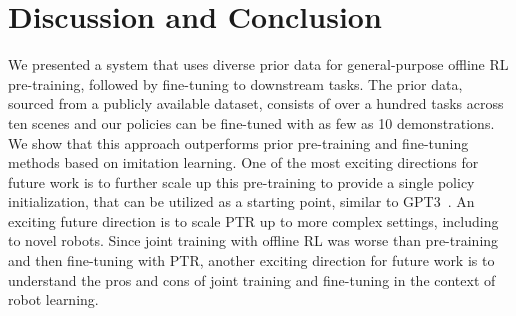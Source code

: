 \documentclass[../thesis.tex]{subfiles}
\begin{document}




\vspace{0.1cm}
\section{Discussion and Conclusion}
\label{sec:conclusion}
\vspace{0.1cm}
We presented a system that uses diverse prior data for general-purpose offline RL pre-training, followed by fine-tuning to downstream tasks. The prior data, sourced from a publicly available dataset, consists of over a hundred tasks across ten scenes and our policies can be fine-tuned with as few as 10 demonstrations. We show that this approach outperforms prior pre-training and fine-tuning methods based on imitation learning. One of the most exciting directions for future work is to further scale up this pre-training to provide a single policy initialization, that can be utilized as a starting point, similar to GPT3~\citep{brown2020language}. 
An exciting future direction is to scale PTR up to more complex settings, including to novel robots. {Since joint training with offline RL was worse than pre-training and then fine-tuning with PTR, another exciting direction for future work is to understand the pros and cons of joint training and fine-tuning in the context of robot learning.}
\end{document}
